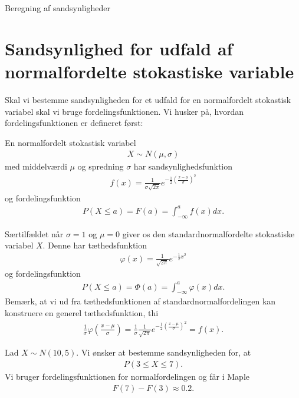 \begin{center}
	\Huge
	Beregning af sandsynligheder
\end{center}
\section*{Sandsynlighed for udfald af normalfordelte stokastiske variable}

Skal vi bestemme sandsynligheden for et udfald for en normalfordelt stokastisk variabel skal vi bruge fordelingsfunktionen. Vi husker på, hvordan fordelingsfunktionen er defineret først:

\begin{defn}
	En normalfordelt stokastisk variabel 
	\begin{align*}
		X \sim N(\mu,\sigma)
	\end{align*}
	med middelværdi $\mu$ og spredning $\sigma$ har sandsynlighedsfunktion
	\begin{align*}
		f(x) = \frac{1}{\sigma\sqrt{2\pi}}e^{-\frac{1}{2}\left(\frac{x-\mu}{\sigma}\right)^2}
	\end{align*}
	og fordelingsfunktion
	\begin{align*}
		P(X\leq a) = F(a) = \int_{-\infty}^a f(x)dx.
	\end{align*}
\end{defn}

\begin{exa}
Særtilfældet når $\sigma = 1$ og $\mu = 0$ giver os den standardnormalfordelte stokastiske variabel $X$. Denne har tæthedsfunktion
\begin{align*}
	\varphi(x) = \frac{1}{\sqrt{2\pi}}e^{-\frac{1}{2}x^2}
\end{align*}
og fordelingsfunktion
\begin{align*}
	P(X\leq a) = \Phi(a) = \int_{-\infty}^a  \varphi(x) dx.
\end{align*}
Bemærk, at vi ud fra tæthedsfunktionen af standardnormalfordelingen kan konstruere en generel tæthedsfunktion, thi
\begin{align*}
	\frac{1}{\sigma}\varphi\left(\frac{x-\mu}{\sigma}\right) = \frac{1}{\sigma}\frac{1}{\sqrt{2\pi}}e^{-\frac{1}{2}\left(\frac{x-\mu}{\sigma}\right)^2} = f(x).
\end{align*}
\end{exa}

\begin{exa}
	Lad $X\sim N(10,5)$. Vi ønsker at bestemme sandsynligheden for, at
	\begin{align*}
		P(3\leq X \leq 7).
	\end{align*}
	Vi bruger fordelingsfunktionen for normalfordelingen og får i Maple
	\begin{align*}
		F(7)-F(3) \approx 0.2.
	\end{align*}
\end{exa}
